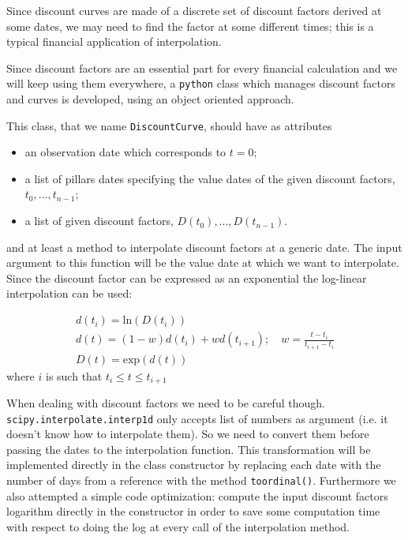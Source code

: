 Since discount curves are made of a discrete set of discount factors derived at some dates, we may need to find the factor at some different times; this is a typical financial application of interpolation.

\begin{finmarkets}
Since discount factors are an essential part for every financial calculation and we will keep using them everywhere, a \texttt{python} class which manages discount factors and curves is developed, using an object oriented approach.

This class, that we name \texttt{DiscountCurve}, should have as attributes
\begin{itemize}
	\tightlist
    \item an observation date which corresponds to $t=0$;
	\item a list of pillars dates specifying the value dates of the given discount factors, $t_0,...,t_{n-1}$;
	\item a list of given discount factors, $D(t_0),...,D(t_{n-1})$.
\end{itemize}

and at least a method to interpolate discount factors at a generic date. The input argument to this function will be the value date at which we want to interpolate. Since the discount factor can be expressed as an exponential the log-linear interpolation can be used:

\begin{equation}
	\begin{gathered}
		d(t_i)=\mathrm{ln}(D(t_i))\\
		d(t) = (1-w)d(t_i) + wd(t_{i+1});\quad w=\frac{t-t_i}{t_{i+1}-t_i}\\
		D(t) = \mathrm{exp}(d(t))
	\end{gathered}
\end{equation}
where $i$ is such that $t_i \le t \le t_{i+1}$

When dealing with discount factors we need to be careful though. \texttt{scipy.interpolate.interp1d} only accepts list of numbers as argument (i.e. it doesn't know how to interpolate them). So we need to convert them before passing the dates to the interpolation function. This transformation will be implemented directly in the class constructor by replacing each date with the number of days from a reference with the method \texttt{toordinal()}.
Furthermore we also attempted a simple code optimization: compute the input discount factors logarithm directly in the constructor in order to save some computation time with respect to doing the log at every call of the interpolation method. 
\end{finmarkets}

